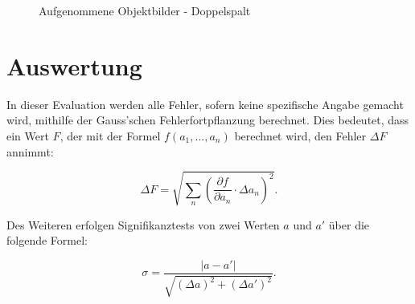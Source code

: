\documentclass{article}
\begin{document}
\begin{figure}[p]
  \hfill
  \hfill
  \caption{Aufgenommene Objektbilder - Doppelspalt}
  \label{fig:Aufnahmen_Obj_Doppel}
\end{figure}

\clearpage
\newpage
\section{Auswertung}

In dieser Evaluation werden alle Fehler, sofern keine spezifische Angabe gemacht wird, mithilfe der Gauss'schen Fehlerfortpflanzung berechnet. Dies bedeutet, dass ein Wert $F$, der mit der Formel $f(a_1, ..., a_n)$ berechnet wird, den Fehler $\Delta F$ annimmt:

\begin{equation}
    \Delta F = \sqrt{\sum_n \left( \frac{\partial f}{\partial a_n} \cdot \Delta a_n \right)^2}.
\end{equation}

Des Weiteren erfolgen Signifikanztests von zwei Werten $a$ und $a'$ über die folgende Formel:

\begin{equation}
    \sigma = \frac{|a-a'|}{\sqrt{(\Delta a)^2 + (\Delta a')^2}}.
\end{equation}
\end{document}
